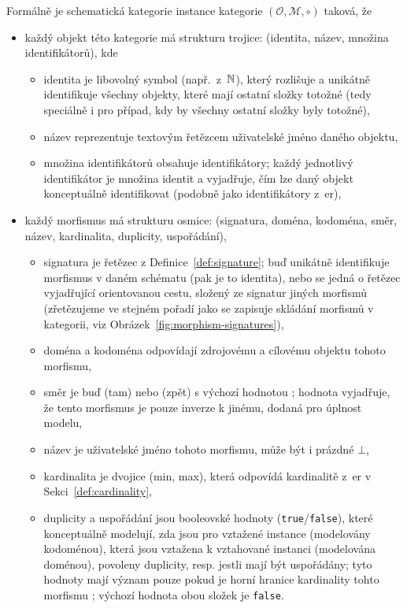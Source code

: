 Formálně je schematická kategorie instance kategorie $(\mathcal O, \mathcal M, \circ)$ taková, že
\begin{itemize}
  \item každý objekt této kategorie má strukturu trojice: (identita, název, množina identifikátorů), kde
        \begin{itemize}
          \item identita je libovolný symbol (např.~z~$\mathbb{N}$), který rozlišuje a unikátně identifikuje všechny objekty, které mají ostatní složky totožné (tedy speciálně i pro případ, kdy by všechny ostatní složky byly totožné),
          \item název reprezentuje textovým řetězcem uživatelské jméno daného objektu,
          \item množina identifikátorů obsahuje identifikátory; každý jednotlivý identifikátor je množina identit a vyjadřuje, čím lze daný objekt konceptuálně identifikovat (podobně jako identifikátory z~\acrshort{er}),
        \end{itemize}
  \item každý morfismus má strukturu osmice: (signatura, doména, kodoména, směr, název, kardinalita, duplicity, uspořádání),
        \begin{itemize}
          \item signatura je řetězec z Definice~\ref{def:signature}; buď unikátně identifikuje morfismus v daném schématu (pak je to identita), nebo se jedná o řetězec vyjadřující orientovanou cestu, složený ze signatur jiných morfismů (zřetězujeme ve stejném pořadí jako se zapisuje skládání morfismů v kategorii, viz Obrázek~\ref{fig:morphism-signatures}),
          \item doména a kodoména odpovídají zdrojovému a cílovému objektu tohoto morfismu,
          \item směr je buď \zero{} (tam) nebo \one{} (zpět) s výchozí hodnotou \zero{}; hodnota \one{} vyjadřuje, že tento morfismus je pouze inverze k jinému, dodaná pro úplnost modelu,
          \item název je uživatelské jméno tohoto morfismu, může být i prázdné $\bot$,
          \item kardinalita je dvojice (min, max), která odpovídá kardinalitě z~\acrshort{er} v Sekci~\ref{def:cardinality},
          \item duplicity a uspořádání jsou booleovské hodnoty (\texttt{true}/\texttt{false}), které konceptuálně modelují, zda jsou pro vztažené instance (modelovány kodoménou), která jsou vztažena k vztahované instanci (modelována doménou), povoleny duplicity, resp. jestli mají být uspořádány; tyto hodnoty mají význam pouze pokud je horní hranice kardinality tohto morfismu \many; výchozí hodnota obou složek je \texttt{false}.
        \end{itemize}
\end{itemize}

